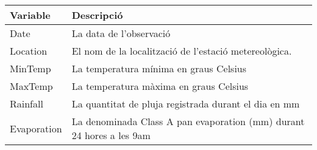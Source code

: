 \documentclass[
]{article}
\begin{document}
\begin{longtable}[]{@{}ll@{}}
\toprule
\begin{minipage}[b]{0.19\columnwidth}\raggedright
Variable\strut
\end{minipage} & \begin{minipage}[b]{0.75\columnwidth}\raggedright
Descripció\strut
\end{minipage}\tabularnewline
\midrule
\endhead
\begin{minipage}[t]{0.19\columnwidth}\raggedright
Date\strut
\end{minipage} & \begin{minipage}[t]{0.75\columnwidth}\raggedright
La data de l'observació\strut
\end{minipage}\tabularnewline
\begin{minipage}[t]{0.19\columnwidth}\raggedright
Location\strut
\end{minipage} & \begin{minipage}[t]{0.75\columnwidth}\raggedright
El nom de la localització de l'estació metereològica.\strut
\end{minipage}\tabularnewline
\begin{minipage}[t]{0.19\columnwidth}\raggedright
MinTemp\strut
\end{minipage} & \begin{minipage}[t]{0.75\columnwidth}\raggedright
La temperatura mínima en graus Celsius\strut
\end{minipage}\tabularnewline
\begin{minipage}[t]{0.19\columnwidth}\raggedright
MaxTemp\strut
\end{minipage} & \begin{minipage}[t]{0.75\columnwidth}\raggedright
La temperatura màxima en graus Celsius\strut
\end{minipage}\tabularnewline
\begin{minipage}[t]{0.19\columnwidth}\raggedright
Rainfall\strut
\end{minipage} & \begin{minipage}[t]{0.75\columnwidth}\raggedright
La quantitat de pluja registrada durant el dia en mm\strut
\end{minipage}\tabularnewline
\begin{minipage}[t]{0.19\columnwidth}\raggedright
Evaporation\strut
\end{minipage} & \begin{minipage}[t]{0.75\columnwidth}\raggedright
La denominada Class A pan evaporation (mm) durant 24 hores a les
9am\strut

\end{minipage}
\end{longtable}
\end{document}
